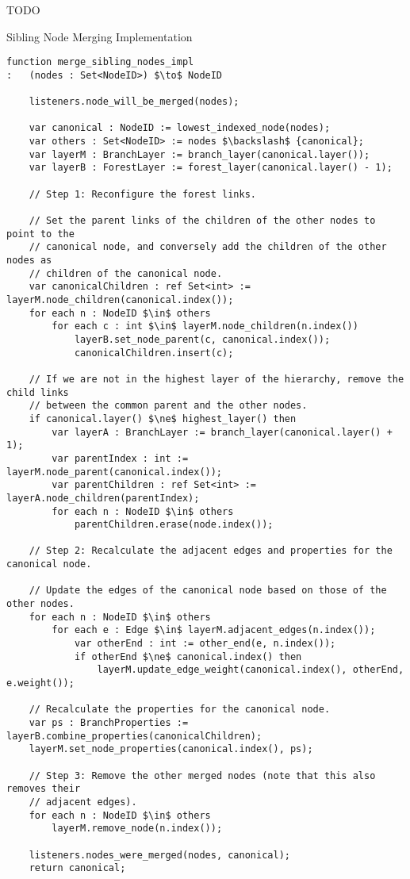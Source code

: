 TODO

\begin{stulisting}[p]
\caption{Sibling Node Merging Implementation}
\label{code:ipfs-forest-mergesiblingnodesimpl}
\begin{lstlisting}[style=Default]
function merge_sibling_nodes_impl
:	(nodes : Set<NodeID>) $\to$ NodeID

	listeners.node_will_be_merged(nodes);

	var canonical : NodeID := lowest_indexed_node(nodes);
	var others : Set<NodeID> := nodes $\backslash$ {canonical};
	var layerM : BranchLayer := branch_layer(canonical.layer());
	var layerB : ForestLayer := forest_layer(canonical.layer() - 1);

	// Step 1: Reconfigure the forest links.

	// Set the parent links of the children of the other nodes to point to the
	// canonical node, and conversely add the children of the other nodes as
	// children of the canonical node.
	var canonicalChildren : ref Set<int> := layerM.node_children(canonical.index());
	for each n : NodeID $\in$ others
		for each c : int $\in$ layerM.node_children(n.index())
			layerB.set_node_parent(c, canonical.index());
			canonicalChildren.insert(c);

	// If we are not in the highest layer of the hierarchy, remove the child links
	// between the common parent and the other nodes.
	if canonical.layer() $\ne$ highest_layer() then
		var layerA : BranchLayer := branch_layer(canonical.layer() + 1);
		var parentIndex : int := layerM.node_parent(canonical.index());
		var parentChildren : ref Set<int> := layerA.node_children(parentIndex);
		for each n : NodeID $\in$ others
			parentChildren.erase(node.index());

	// Step 2: Recalculate the adjacent edges and properties for the canonical node.

	// Update the edges of the canonical node based on those of the other nodes.
	for each n : NodeID $\in$ others
		for each e : Edge $\in$ layerM.adjacent_edges(n.index());
			var otherEnd : int := other_end(e, n.index());
			if otherEnd $\ne$ canonical.index() then
				layerM.update_edge_weight(canonical.index(), otherEnd, e.weight());

	// Recalculate the properties for the canonical node.
	var ps : BranchProperties := layerB.combine_properties(canonicalChildren);
	layerM.set_node_properties(canonical.index(), ps);

	// Step 3: Remove the other merged nodes (note that this also removes their
	// adjacent edges).
	for each n : NodeID $\in$ others
		layerM.remove_node(n.index());

	listeners.nodes_were_merged(nodes, canonical);
	return canonical;
\end{lstlisting}
\end{stulisting}

